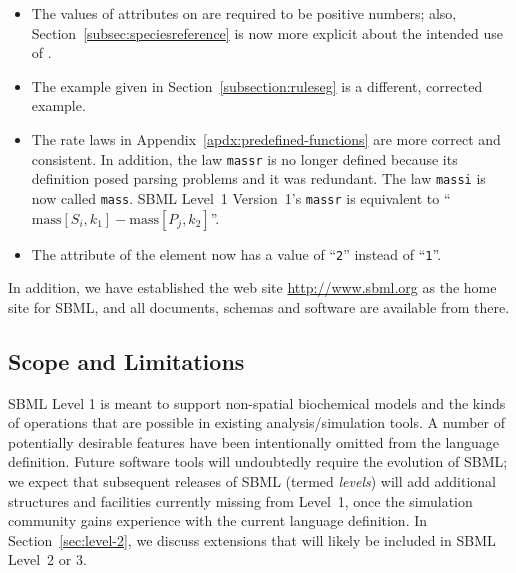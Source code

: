 \documentclass[10pt]{cekarticle}
\newcommand{\changed}[1]{\textcolor{BrickRed}{#1}}
\newenvironment{blockChanged}{\color{BrickRed}}{}
\begin{document}
\begin{blockChanged}
\begin{itemize}
\item The values of attributes on  are required to
  be positive numbers; also, Section~\ref{subsec:speciesreference} is now
  more explicit about the intended use of .
  
\item The example given in Section~\ref{subsection:ruleseg} is a different,
  corrected example.
  
\item The rate laws in Appendix~\ref{apdx:predefined-functions} are more
  correct and consistent.  In addition, the law \texttt{massr} is no longer
  defined because its definition posed parsing problems and it was
  redundant.  The law \texttt{massi} is now called \texttt{mass}.  SBML
  Level~1 Version~1's \texttt{massr} is equivalent to
  ``$\text{mass}[S_i,k_1] - \text{mass}[P_j,k_2]$''.

\item The  attribute of the  element now has a
  value of ``\texttt{2}'' instead of ``\texttt{1}''.
  
\end{itemize}

In addition, we have established the web site \url{http://www.sbml.org} as
the home site for SBML, and all documents, schemas and software are
available from there.

\end{blockChanged}


\subsection{Scope and Limitations}

SBML Level 1 is meant to support non-spatial biochemical models and the
kinds of operations that are possible in existing analysis/simulation
tools.  A number of potentially desirable features have been intentionally
omitted from the language definition.  Future software tools will
undoubtedly require the evolution of SBML; we expect that subsequent
releases of SBML (termed \emph{levels}) will add additional structures and
facilities currently missing from Level~1, once the simulation community
gains experience with the current language definition.  In
Section~\ref{sec:level-2}, we discuss extensions that will likely be
included in SBML Level~2 \changed{or 3}.
\end{document}
